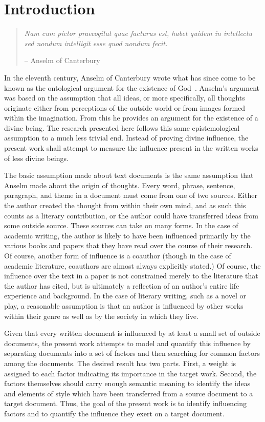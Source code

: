 \documentclass[../ut-dissertation.tex]{subfiles}
\begin{document}

\chapter{Introduction}
\begin{quote}
\textit{Nam cum pictor praecogitat quae facturus est, habet quidem in
intellectu sed nondum intelligit esse quod nondum fecit.}

-- Anselm of Canterbury~\cite{anselm}
\end{quote}
In the eleventh century, Anselm of Canterbury wrote what has since
come to be known as the ontological argument for the existence of
God~\cite{anselm}.  Anselm's argument was based on the assumption that
all ideas, or more specifically, all thoughts originate either from
perceptions of the outside world or from images formed within the
imagination.  From this he provides an argument for the existence of
a divine being.  The research presented here follows this same
epistemological assumption to a much less trivial end.
Instead of proving divine influence, the present work shall attempt to
measure the influence present in the written works of less divine beings.

The basic assumption made about text documents is the same assumption
that Anselm made about the origin of thoughts.  Every word, phrase,
sentence, paragraph, and theme in a document must come from one of two
sources.  Either the author created the thought from within their own
mind, and as such this counts as a literary contribution, or the
author could have transferred ideas from some outside source.  These
sources can take on many forms.  In the case of academic writing, the
author is likely to have been influenced primarily by the various
books and papers that they have read over the course of their
research.  Of course, another form of influence is a coauthor (though
in the case of academic literature, coauthors are almost always
explicitly stated.)  Of course, the influence over the text in a paper
is not constrained merely to the literature that the author has cited,
but is ultimately a reflection of an author's entire life experience
and background.  In the case of literary writing, such as a novel or
play, a reasonable assumption is that an author is influenced by other
works within their genre as well as by the society in which they live.

Given that every written document is influenced by at least a small
set of outside documents, the present work attempts to model and
quantify this influence by separating documents into a set of factors
and then searching for common factors among the documents.  The
desired result has two parts.  First, a weight is assigned to each
factor indicating its importance in the target work.  Second, the
factors themselves should carry enough semantic meaning to identify
the ideas and elements of style which have been transferred from a
source document to a target document.  Thus, the goal of the present
work is to identify influencing factors and to quantify the influence
they exert on a target document.
\end{document}
